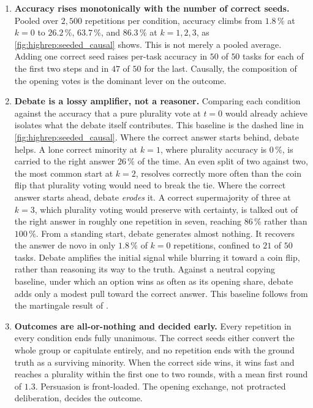 \begin{enumerate}
\renewcommand{\labelenumi}{(\roman{enumi})}
  \item \textbf{Accuracy rises monotonically with the number of correct seeds.}
        Pooled over $2{,}500$ repetitions per condition, accuracy climbs from
        $1.8\,\%$ at $k=0$ to $26.2\,\%$, $63.7\,\%$, and $86.3\,\%$ at $k=1,2,3$,
        as \autoref{fig:highrep:seeded_causal} shows. This is not merely a pooled
        average. Adding one correct seed raises per-task accuracy in $50$ of $50$
        tasks for each of the first two steps and in $47$ of $50$ for the last.
        Causally, the composition of the opening votes is the dominant lever on the
        outcome.

  \item \textbf{Debate is a lossy amplifier, not a reasoner.} Comparing each
        condition against the accuracy that a pure plurality vote at $t=0$ would
        already achieve isolates what the debate itself contributes. This baseline
        is the dashed line in \autoref{fig:highrep:seeded_causal}. Where the correct
        answer starts behind, debate helps. A lone correct minority at $k=1$, where
        plurality accuracy is $0\,\%$, is carried to the right answer $26\,\%$ of the
        time. An even split of two against two, the most common start at $k=2$,
        resolves correctly
        more often than the coin flip that plurality voting would need to break
        the tie. Where the correct answer
        starts ahead, debate \emph{erodes} it. A correct supermajority of three at
        $k=3$, which plurality voting would preserve with certainty, is talked out of
        the right answer in roughly one repetition in seven, reaching $86\,\%$ rather
        than $100\,\%$. From a standing start, debate generates almost nothing. It
        recovers the answer de novo in only $1.8\,\%$ of $k=0$ repetitions, confined
        to $21$ of $50$ tasks. Debate amplifies the initial signal while blurring it
        toward a coin flip, rather than reasoning its way to the truth. Against a
        neutral copying baseline, under which an option wins as often as its
        opening share, debate adds only a modest pull toward the correct answer.
        This baseline follows from the martingale result of
        \citet{zhang2025debateorvote}.

  \item \textbf{Outcomes are all-or-nothing and decided early.} Every repetition in
        every condition ends fully unanimous. The correct seeds either convert the
        whole group or capitulate entirely, and no repetition ends with the ground truth as a surviving minority. When the correct side wins, it wins fast and
        reaches a plurality within the first one to two rounds, with a mean first
        round of $1.3$. Persuasion is front-loaded. The opening exchange, not
        protracted deliberation, decides the outcome.
\end{enumerate}

